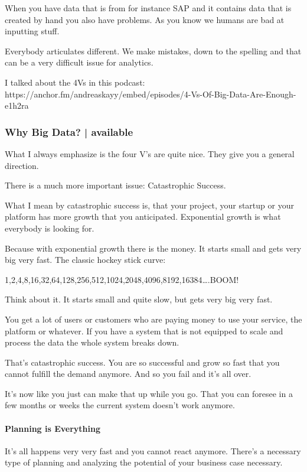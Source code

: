 \documentclass[12pt]{scrartcl} %
\begin{document}
When you have data that is from for instance SAP and it contains data that is created by hand you also have problems. As you know we humans are bad at inputting stuff.

Everybody articulates different. We make mistakes, down to the spelling and that can be a very difficult issue for analytics.


I talked about the 4Vs in this podcast: https://anchor.fm/andreaskayy/embed/episodes/4-Vs-Of-Big-Data-Are-Enough-e1h2ra

\subsubsection{Why Big Data? | available}

What I always emphasize is the four V’s are quite nice. They give you a general direction.

There is a much more important issue: Catastrophic Success.

What I mean by catastrophic success is, that your project, your startup or your platform has more growth that you anticipated. Exponential growth is what everybody is looking for.

Because with exponential growth there is the money. It starts small and gets very big very fast. The classic hockey stick curve:

1,2,4,8,16,32,64,128,256,512,1024,2048,4096,8192,16384….BOOM!

Think about it. It starts small and quite slow, but gets very big very fast.

You get a lot of users or customers who are paying money to use your service, the platform or whatever. If you have a system that is not equipped to scale and process the data the whole system breaks down.

That’s catastrophic success. You are so successful and grow so fast that you cannot fulfill the demand anymore. And so you fail and it’s all over.

It’s now like you just can make that up while you go. That you can foresee in a few months or weeks the current system doesn’t work anymore.

\paragraph{Planning is Everything}

It’s all happens very very fast and you cannot react anymore. There’s a necessary type of planning and analyzing the potential of your business case necessary.
\end{document}
